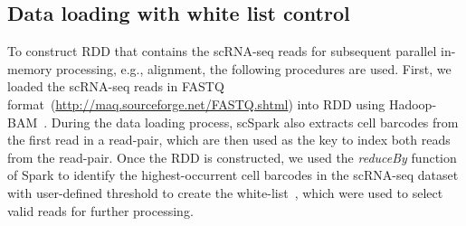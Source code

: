 \documentclass[conference]{IEEEtran}
\begin{document}

\subsection{Data loading with white list control}

To construct RDD that contains the scRNA-seq reads for subsequent parallel in-memory processing, e.g., alignment, the following procedures are used.
First, we loaded the scRNA-seq reads in FASTQ format~(\url{http://maq.sourceforge.net/FASTQ.shtml}) into RDD using Hadoop-BAM~\cite{hadoopBAM}.
During the data loading process, scSpark also extracts cell barcodes from the first read in a read-pair, which are then used as the key to index both reads from the read-pair.
Once the RDD is constructed, we used the \textit{reduceBy} function of Spark to identify the highest-occurrent cell barcodes in the scRNA-seq dataset with user-defined threshold to create the white-list~\cite{guo2018bioinformatics}, which were used to select valid reads for further processing. 


\end{document}

